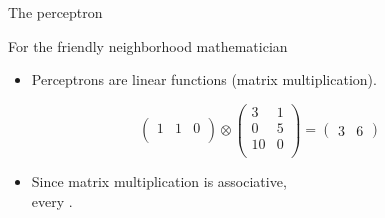 \documentclass[xcolor={usenames,svgnames,x11names,dvipsnames,table}]{beamer}
\begin{document}
\begin{frame}{The perceptron}
\begin{center}
{
        }
    \end{center}
\end{frame}

\begin{frame}{For the friendly neighborhood mathematician}
    \begin{itemize}
        \item Perceptrons are linear functions (matrix multiplication).
    \end{itemize}

    \begin{example}
        $$
        \begin{pmatrix}
            1 & 1 & 0\\
        \end{pmatrix}
        \otimes
        \begin{pmatrix}
            3 & 1\\
            0 & 5\\
            10 & 0\\
        \end{pmatrix}
        =
        \begin{pmatrix}
            3 & 6
        \end{pmatrix}
        $$
    \end{example}

    \begin{itemize}
        \item Since matrix multiplication is associative,\\
              every .
    \end{itemize}


\end{frame}
\end{document}
